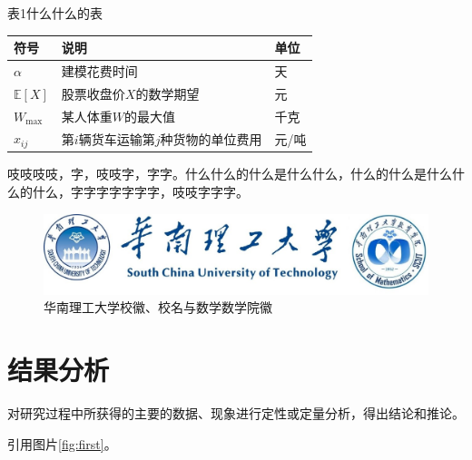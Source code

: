 \documentclass{ctexart}
\begin{document}
\begin{table}[h]
	\centering
	表1\quad 什么什么的表\vspace{1ex}
	\begin{tabular}{p{2cm}<{\centering}p{9cm}<{\centering}p{2cm}<{\centering}}
		\toprule
		符号 & 说明 & 单位 \\
		\midrule
		$\alpha$ & 建模花费时间  & 天   \\
		$\mathbb{E}[X]$ & 股票收盘价$X$的数学期望 & 元 \\
		$W_{\text{max}}$ & 某人体重$W$的最大值 & 千克  \\
		$x_{ij}$ & 第$i$辆货车运输第$j$种货物的单位费用&  元/吨 \\
		\bottomrule
	\end{tabular}
\end{table}

吱吱吱吱，字，吱吱字，字字。什么什么的什么是什么什么，什么的什么是什么什么的什么，字字字字字字字，吱吱字字字。

\begin{figure}[htb]
	\centering
	\includegraphics[width=1\linewidth]{./figure/logo}
	\caption{华南理工大学校徽、校名与数学数学院徽}
	\label{fig:logo}
\end{figure}

\section{结果分析}

对研究过程中所获得的主要的数据、现象进行定性或定量分析，得出结论和推论。

引用图片\ref{fig:first}。
\end{document}
